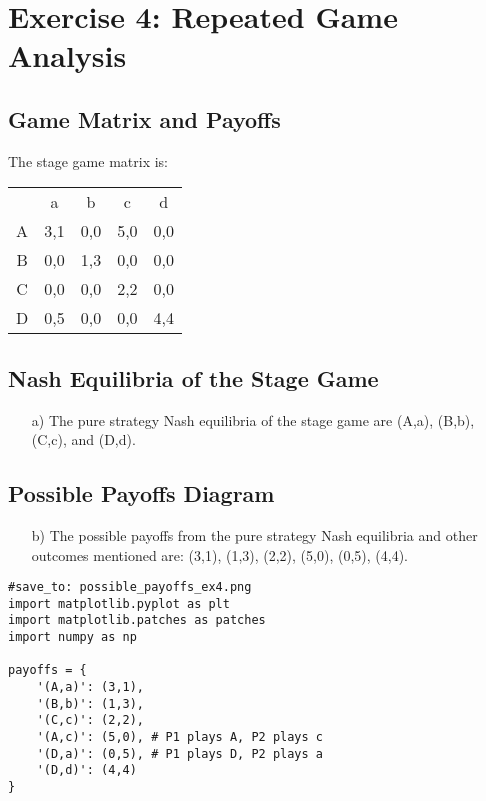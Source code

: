 \section*{Exercise 4: Repeated Game Analysis}
\begin{solution}
\subsection*{Game Matrix and Payoffs}
The stage game matrix is:
\begin{center}
\begin{tabular}{c|c|c|c|c|}
 & \multicolumn{1}{c}{a} & \multicolumn{1}{c}{b} & \multicolumn{1}{c}{c} & \multicolumn{1}{c}{d} \\ \cline{2-5}
A & 3,1 & 0,0 & 5,0 & 0,0 \\ \cline{2-5}
B & 0,0 & 1,3 & 0,0 & 0,0 \\ \cline{2-5}
C & 0,0 & 0,0 & 2,2 & 0,0 \\ \cline{2-5}
D & 0,5 & 0,0 & 0,0 & 4,4 \\ \cline{2-5}
\end{tabular}
\end{center}

\subsection*{Nash Equilibria of the Stage Game}
\begin{enumerate}
    \item[a)] The pure strategy Nash equilibria of the stage game are (A,a), (B,b), (C,c), and (D,d).
\end{enumerate}

\subsection*{Possible Payoffs Diagram}
\begin{enumerate}
    \item[b)] The possible payoffs from the pure strategy Nash equilibria and other outcomes mentioned are: (3,1), (1,3), (2,2), (5,0), (0,5), (4,4).
\end{enumerate}
\begin{verbatim}
#save_to: possible_payoffs_ex4.png
import matplotlib.pyplot as plt
import matplotlib.patches as patches
import numpy as np

payoffs = {
    '(A,a)': (3,1),
    '(B,b)': (1,3),
    '(C,c)': (2,2),
    '(A,c)': (5,0), # P1 plays A, P2 plays c
    '(D,a)': (0,5), # P1 plays D, P2 plays a
    '(D,d)': (4,4)
}


\end{verbatim}
\end{solution}
